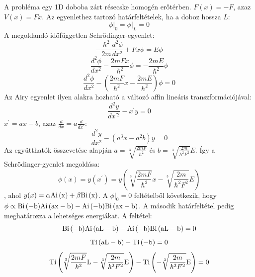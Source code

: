 A probléma egy 1D doboba zárt résecske homogén erőtérben. $F(x)=-F$, azaz $V(x) = Fx$.
	Az egyenlethez tartozó határfeltételek, ha a doboz hossza $L$:
	\begin{equation}
		\phi \big\rvert_0 = \phi \big \rvert_L = 0
	\end{equation}
	A megoldandó időfüggetlen Schrödinger-egyenlet:
	\begin{equation}
		-\frac{\hbar^2}{2m}\frac{d^2\phi}{dx^2} + Fx\phi = E\phi
	\end{equation}
	\begin{equation}
		\frac{d^2\phi}{dx^2} - \frac{2mFx}{\hbar^2}\phi = -\frac{2mE}{\hbar^2}\phi
	\end{equation}
	\begin{equation}
		\frac{d^2\phi}{dx^2} - \left(\frac{2mF}{\hbar^2}x - \frac{2mE}{\hbar^2}\right)\phi = 0
	\end{equation}
	Az Airy egyenlet ilyen alakra hozható a változó affin lineáris transzformációjával:
	\begin{equation}
		\frac{d^2y}{dx^{\prime 2}} - x^\prime y = 0
	\end{equation}
	$x^\prime = ax - b$, azaz $\frac{d}{dx} = a\frac{d}{dx^\prime}$:
	\begin{equation}
		\frac{d^2y}{dx^2} - \left(a^3x - a^2b\right)y = 0
	\end{equation}
	Az együtthatók összevetése alapján $a = \sqrt[3]{\frac{2mF}{\hbar^2}}$ és $b = \sqrt[3]{\frac{2m}{\hbar^2F^2}}E$. Így a Schrödinger-gyenlet megoldása:
	\begin{equation}
		\phi(x) = y(x^\prime) = y\left(\sqrt[3]{\frac{2mF}{\hbar^2}}x - \sqrt[3]{\frac{2m}{\hbar^2F^2}}E\right)
	\end{equation}
	, ahol $y(x) = \alpha \mathrm{Ai\left(x\right)} + \beta \mathrm{Bi\left(x\right)}$.
	A $\phi \big\rvert_0 = 0$ feltételből következik, hogy $\phi \propto \mathrm{Bi\left(-b\right)}\mathrm{Ai\left(ax-b\right)} - \mathrm{Ai\left(-b\right)}\mathrm{Bi\left(ax-b\right)}$. A második határfeltétel pedig meghatározza a lehetséges energiákat. A feltétel:
	\begin{equation}
		\mathrm{Bi\left(-b\right)}\mathrm{Ai\left(aL-b\right)} - \mathrm{Ai\left(-b\right)}\mathrm{Bi\left(aL-b\right)} = 0
	\end{equation}
	\begin{equation}
		\label{box_energiaszintek_egyenlet}
		\mathrm{Ti\left(aL-b\right)} - \mathrm{Ti\left(-b\right)} = 0
	\end{equation}
	\begin{equation}
		\mathrm{Ti\left(\sqrt[3]{\frac{2mF}{\hbar^2}}L - \sqrt[3]{\frac{2m}{\hbar^2F^2}}E\right)} - \mathrm{Ti\left(-\sqrt[3]{\frac{2m}{\hbar^2F^2}}E\right)} = 0
	\end{equation}
